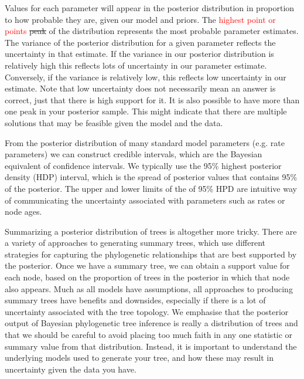 \documentclass[11pt]{article}
\newcommand{\edit}[1]{{\textcolor{red}{#1}}} %
\begin{document}
Values for each parameter will appear in the posterior distribution in proportion to how probable they are, given our model and priors.
The \edit{highest point or points} \sout{peak} of the distribution represents the most probable parameter estimates.
The variance of the posterior distribution for a given parameter reflects the uncertainty in that estimate.
If the variance in our posterior distribution is relatively high this reflects lots of uncertainty in our parameter estimate.
Conversely, if the variance is relatively low, this reflects low uncertainty in our estimate.
Note that low uncertainty does not necessarily mean an answer is correct, just that there is high support for it.
It is also possible to have more than one peak in your posterior sample.
This might indicate that there are multiple solutions that may be feasible given the model and the data.

From the posterior distribution of many standard model parameters (e.g. rate parameters) we can construct credible intervals, which are the Bayesian equivalent of confidence intervals.  
We typically use the 95\% highest posterior density (HDP) interval, which is the spread of posterior values that contains 95\% of the posterior.
The upper and lower limits of the of 95\% HPD are intuitive way of communicating the uncertainty associated with parameters such as rates or node ages.

Summarizing a posterior distribution of trees is altogether more tricky.
There are a variety of approaches to generating summary trees, which use different strategies for capturing the phylogenetic relationships that are best supported by the posterior.
Once we have a summary tree, we can obtain a  support value for each node, based on the proportion of trees in the posterior in which that node also appears. %
Much as all models have assumptions, all approaches to producing summary trees have benefits and downsides, especially if there is a lot of uncertainty associated with the tree topology.
We emphasise that the posterior output of Bayesian phylogenetic tree inference is really a distribution of trees and that we should be careful to avoid placing too much faith in any one statistic or summary value from that distribution.
Instead, it is important to understand the underlying models used to generate your tree, and how these may result in uncertainty given the data you have.
\end{document}
